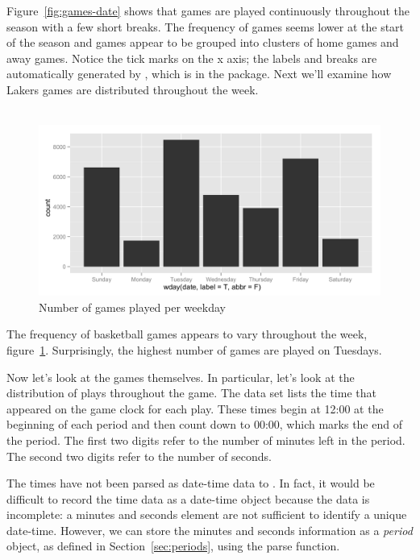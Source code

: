 \documentclass[article]{jss}
\begin{document}
Figure~\ref{fig:games-date} shows that games are played continuously throughout the season with a few short breaks. The frequency of games seems lower at the start of the season and games appear to be grouped into clusters of home games and away games. Notice the tick marks on the x axis; the labels and breaks are automatically generated by , which is in the  package. Next we'll examine how Lakers games are distributed throughout the week.\\

\\

\begin{figure}[htpb]
  \centering    
    \includegraphics[width=\textwidth]{weekdays-histogram.png}     
  \caption{Number of games played per weekday}
  \label{fig:games-days}
\end{figure}


The frequency of basketball games appears to vary throughout the week, figure~\ref{fig:games-days}. Surprisingly, the highest number of games are played on Tuesdays.

Now let's look at the games themselves. In particular, let's look at the distribution of plays throughout the game. The  data set lists the time that appeared on the game clock for each play. These times begin at 12:00 at the beginning of each period and then count down to 00:00, which marks the end of the period. The first two digits refer to the number of minutes left in the period. The second two digits refer to the number of seconds.

The times have not been parsed as date-time data to . In fact, it would be difficult to record the time data as a date-time object because the data is incomplete: a minutes and seconds element are not sufficient to identify a unique date-time. However, we can store the minutes and seconds information as a \emph{period} object, as defined in Section~\ref{sec:periods}, using the  parse function.\\
\end{document}
